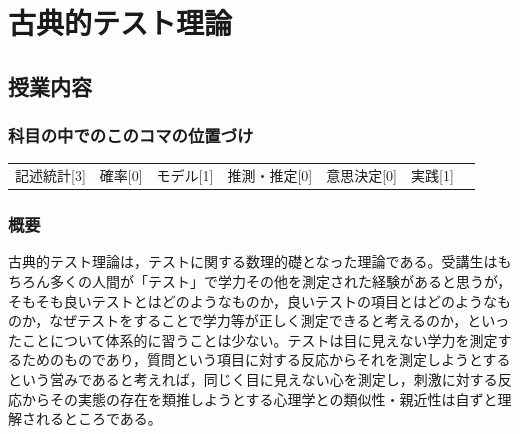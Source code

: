 \section{古典的テスト理論}
\label{lesson06}

\subsection{授業内容}
\subsubsection{科目の中でのこのコマの位置づけ}
\begin{tabular}[t]{ccccccc}
    記述統計[3] & 確率[0] & モデル[1] & 推測・推定[0] & 意思決定[0] & 実践[1]
\end{tabular}
\subsubsection{概要}
古典的テスト理論は，テストに関する数理的礎となった理論である。受講生はもちろん多くの人間が「テスト」で学力その他を測定された経験があると思うが，そもそも良いテストとはどのようなものか，良いテストの項目とはどのようなものか，なぜテストをすることで学力等が正しく測定できると考えるのか，といったことについて体系的に習うことは少ない。テストは目に見えない学力を測定するためのものであり，質問という項目に対する反応からそれを測定しようとするという営みであると考えれば，同じく目に見えない心を測定し，刺激に対する反応からその実態の存在を類推しようとする心理学との類似性・親近性は自ずと理解されるところである。
